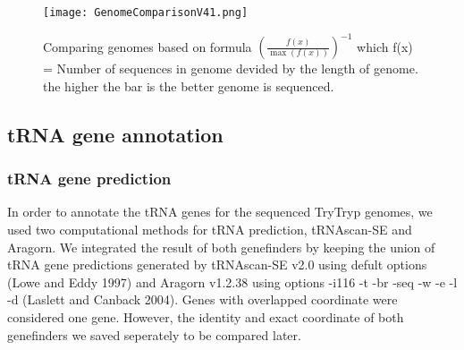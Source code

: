 \documentclass[
10pt, %
a4paper, %
oneside, %
headinclude,footinclude, %
BCOR5mm, %
]{scrartcl}
\begin{document}
\begin{figure}[tb]
\centering 
\texttt{[image: GenomeComparisonV41.png]} 
\caption[Genome Comparison]{Comparing genomes based on formula ${(\frac{f(x)}{\max(f(x))})}^{-1}$ which f(x) = Number of sequences in genome devided by the length of genome. the higher the bar is the better genome is sequenced.} %
\label{fig:gallery} 
\end{figure}

\subsection{\textbf{tRNA gene annotation}}
\subsubsection*{tRNA gene prediction}
In order to annotate the tRNA genes for the sequenced TryTryp genomes, we used two computational methods for tRNA prediction, tRNAscan-SE and Aragorn. We integrated the result of both genefinders by keeping the union of tRNA gene predictions generated by tRNAscan-SE v2.0 using defult options (Lowe and Eddy 1997) and Aragorn v1.2.38 using options -i116 -t -br -seq -w -e -l -d (Laslett and Canback 2004). Genes with overlapped coordinate were considered one gene. However, the identity and exact coordinate of both genefinders we saved seperately to be compared later. 

\end{document}
